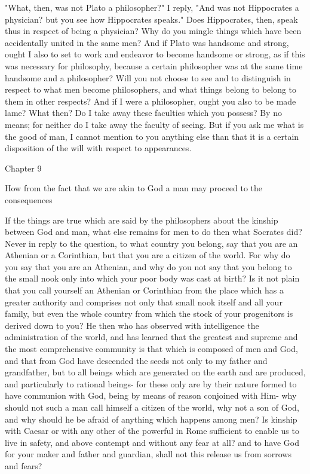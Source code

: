 \documentclass[a4paper]{article}
\begin{document}
"What, then, was not Plato a philosopher?" I reply, "And was not Hippocrates
a physician? but you see how Hippocrates speaks." Does Hippocrates,
then, speak thus in respect of being a physician? Why do you mingle
things which have been accidentally united in the same men? And if
Plato was handsome and strong, ought I also to set to work and endeavor
to become handsome or strong, as if this was necessary for philosophy,
because a certain philosopher was at the same time handsome and a
philosopher? Will you not choose to see and to distinguish in respect
to what men become philosophers, and what things belong to belong
to them in other respects? And if I were a philosopher, ought you
also to be made lame? What then? Do I take away these faculties which
you possess? By no means; for neither do I take away the faculty of
seeing. But if you ask me what is the good of man, I cannot mention
to you anything else than that it is a certain disposition of the
will with respect to appearances. 

Chapter 9

How from the fact that we are akin to God a man may proceed to the
consequences 

If the things are true which are said by the philosophers about the
kinship between God and man, what else remains for men to do then
what Socrates did? Never in reply to the question, to what country
you belong, say that you are an Athenian or a Corinthian, but that
you are a citizen of the world. For why do you say that you are an
Athenian, and why do you not say that you belong to the small nook
only into which your poor body was cast at birth? Is it not plain
that you call yourself an Athenian or Corinthian from the place which
has a greater authority and comprises not only that small nook itself
and all your family, but even the whole country from which the stock
of your progenitors is derived down to you? He then who has observed
with intelligence the administration of the world, and has learned
that the greatest and supreme and the most comprehensive community
is that which is composed of men and God, and that from God have descended
the seeds not only to my father and grandfather, but to all beings
which are generated on the earth and are produced, and particularly
to rational beings- for these only are by their nature formed to have
communion with God, being by means of reason conjoined with Him- why
should not such a man call himself a citizen of the world, why not
a son of God, and why should he be afraid of anything which happens
among men? Is kinship with Caesar or with any other of the powerful
in Rome sufficient to enable us to live in safety, and above contempt
and without any fear at all? and to have God for your maker and father
and guardian, shall not this release us from sorrows and fears?
\end{document}
